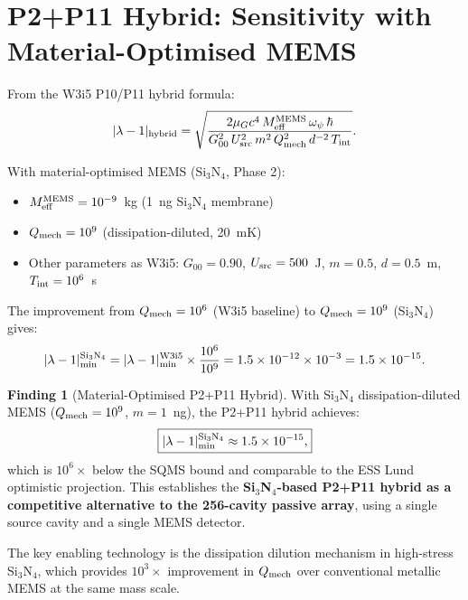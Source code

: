 \documentclass[11pt]{article}
\theoremstyle{definition}
\newtheorem{finding}[theorem]{Finding}
\theoremstyle{remark}
\newcommand{\ee}[1]{\times 10^{#1}}
\newcommand{\Meff}{M_{\rm eff}}
\newcommand{\Opsi}{\omega_\psi}
\newcommand{\lam}{|\lambda-1|}
\newcommand{\muG}{\mu_G}
\begin{document}
\section{P2+P11 Hybrid: Sensitivity with Material-Optimised MEMS}
\label{sec:p2p11_materials}

From the W3i5 P10/P11 hybrid formula:
\begin{equation}
  \lam_{\rm hybrid} = \sqrt{
  \frac{2\muG c^4\,\Meff^{\rm MEMS}\,\Opsi\,\hbar}
  {G_{00}^2\,U_{\rm src}^2\,m^2\,Q_{\rm mech}^2\,d^{-2}\,T_{\rm int}}
  }.
  \label{eq:hybrid_formula_ref}
\end{equation}

With material-optimised MEMS (Si$_3$N$_4$, Phase 2):
\begin{itemize}[nosep]
  \item $\Meff^{\rm MEMS} = 10^{-9}$~kg (1~ng Si$_3$N$_4$ membrane)
  \item $Q_{\rm mech} = 10^9$ (dissipation-diluted, 20~mK)
  \item Other parameters as W3i5: $G_{00} = 0.90$, $U_{\rm src} = 500$~J,
    $m = 0.5$, $d = 0.5$~m, $T_{\rm int} = 10^6$~s
\end{itemize}

The improvement from $Q_{\rm mech} = 10^6$ (W3i5 baseline) to
$Q_{\rm mech} = 10^9$ (Si$_3$N$_4$) gives:
\begin{equation}
  \lam_{\rm min}^{\rm Si_3N_4} = \lam_{\rm min}^{\rm W3i5}
  \times \frac{10^6}{10^9} = 1.5\ee{-12} \times 10^{-3}
  = 1.5\ee{-15}.
\end{equation}

\begin{finding}[Material-Optimised P2+P11 Hybrid]
\label{find:optimised_hybrid}
With Si$_3$N$_4$ dissipation-diluted MEMS ($Q_{\rm mech} = 10^9$,
$m = 1$~ng), the P2+P11 hybrid achieves:
\begin{equation}
  \boxed{\lam_{\rm min}^{\rm Si_3N_4} \approx 1.5\ee{-15},}
\end{equation}
which is $10^6\times$ below the SQMS bound and comparable to the
ESS Lund optimistic projection. This establishes the \textbf{Si$_3$N$_4$-based
P2+P11 hybrid as a competitive alternative to the 256-cavity passive
array}, using a single source cavity and a single MEMS detector.

The key enabling technology is the dissipation dilution mechanism in
high-stress Si$_3$N$_4$, which provides $10^3\times$ improvement in
$Q_{\rm mech}$ over conventional metallic MEMS at the same mass scale.
\end{finding}
\end{document}

